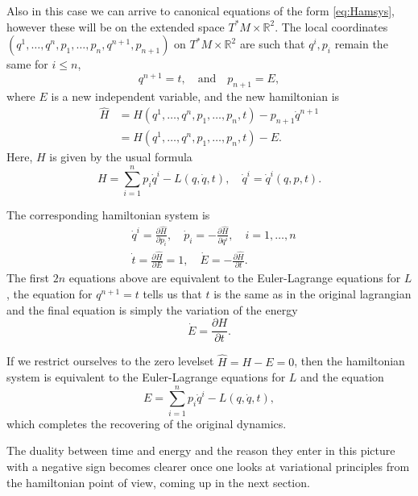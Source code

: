 \documentclass[english,fontsize=11pt,paper=a5,oneside]{scrbook}
\newcommand{\R}{\mathbb{R}}
\theoremstyle{definition}
\begin{document}
Also in this case we can arrive to canonical equations of the form \eqref{eq:Hamsys}, however these will be on the extended space $T^*M\times\R^2$. The local coordinates $(q^1,\ldots,q^n, p_1, \ldots,p_n, q^{n+1}, p_{n+1})$ on $T^*M\times\R^2$ are such that $q^i, p_i$ remain the same for $i\leq n$,
\begin{equation}
  q^{n+1} = t, \quad\mbox{and}\quad
  p_{n+1} = E,
\end{equation}
where $E$ is a new independent variable, and the new hamiltonian is
\begin{align}
  \hat H & = H(q^1, \ldots, q^n, p_1, \ldots, p_n, t) - p_{n+1}\dot q^{n+1} \\
         & = H(q^1, \ldots, q^n, p_1, \ldots, p_n, t) - E.
\end{align}
Here, $H$ is given by the usual formula
\begin{equation}
  H = \sum_{i=1}^n p_i \dot q^i - L(q, \dot q, t), \quad \dot q^i = \dot q^i(q,p,t).
\end{equation}

The corresponding hamiltonian system is
\begin{align}
   & \dot q^i = \frac{\partial \hat H}{\partial p_i}, \quad
  \dot p_i = -\frac{\partial \hat H}{\partial q^i}, \quad
  i=1,\ldots,n                                                                                              \\
   & \dot t = \frac{\partial \hat H}{\partial E} = 1, \quad {\dot E} = -\frac{\partial \hat H}{\partial t}.
\end{align}
The first $2n$ equations above are equivalent to the Euler-Lagrange equations for $L$, the equation for $q^{n+1} = t$ tells us that $t$ is the same as in the original lagrangian and the final equation is simply the variation of the energy
\begin{equation}
  \dot E = \frac{\partial H}{\partial t}.
\end{equation}

If we restrict ourselves to the zero levelset $\hat H = H - E = 0$, then the hamiltonian system is equivalent to the Euler-Lagrange equations for $L$ and the equation
\begin{equation}
  E = \sum_{i=1}^n p_i \dot q^i - L(q, \dot q, t),
\end{equation}
which completes the recovering of the original dynamics.

The duality between time and energy and the reason they enter in this picture with a negative sign becomes clearer once one looks at variational principles from the hamiltonian point of view, coming up in the next section.
\end{document}

